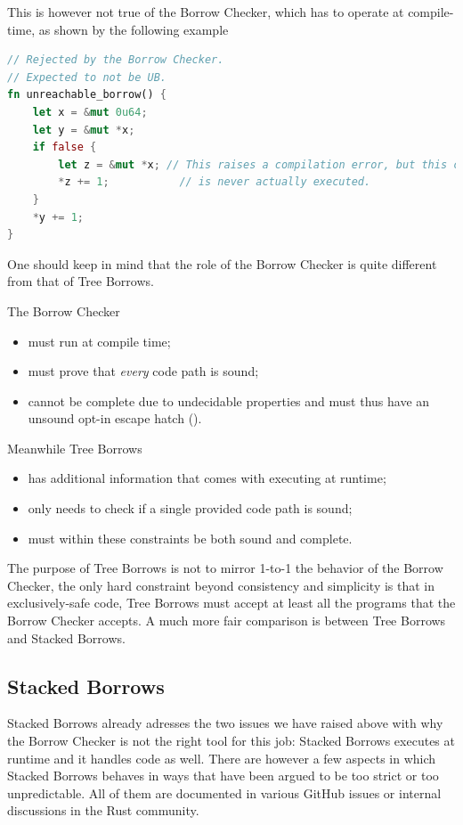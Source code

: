 \documentclass[a4paper,11pt]{article}
\theoremstyle{plain}
\theoremstyle{definition}
\theoremstyle{remark}
\newcommand{\tcode}[1]{\rstinline{#1}}
\begin{document}
This is however not true of the Borrow Checker, which has to operate at compile-time,
as shown by the following example
\begin{lstlisting}[language=rust]
// Rejected by the Borrow Checker.
// Expected to not be UB.
fn unreachable_borrow() {
    let x = &mut 0u64;
    let y = &mut *x;
    if false {
        let z = &mut *x; // This raises a compilation error, but this code
        *z += 1;           // is never actually executed.
    }
    *y += 1;
}
\end{lstlisting}

One should keep in mind that the role of the Borrow Checker is quite different
from that of Tree Borrows.

The Borrow Checker
\begin{itemize}
    \item must run at compile time;
    \item must prove that \textit{every} code path is sound;
    \item cannot be complete due to undecidable properties and must thus
        have an unsound opt-in escape hatch (\tcode{unsafe}).
\end{itemize}
Meanwhile Tree Borrows
\begin{itemize}
    \item has additional information that comes with executing at runtime;
    \item only needs to check if a single provided code path is sound;
    \item must within these constraints be both sound and complete.
\end{itemize}

The purpose of Tree Borrows is not to mirror 1-to-1 the behavior of the Borrow
Checker, the only hard constraint beyond consistency and simplicity is that
in exclusively-safe code, Tree Borrows must accept at least all the programs
that the Borrow Checker accepts.
A much more fair comparison is between Tree Borrows and Stacked Borrows.

\subsection{Stacked Borrows}

Stacked Borrows already adresses the two issues we have raised above with
why the Borrow Checker is not the right tool for this job: Stacked Borrows
executes at runtime and it handles
\tcode{unsafe} code as well. There are however a few aspects in which
Stacked Borrows behaves in ways that have been argued to be too strict or
too unpredictable. All of them are documented in various GitHub issues
or internal discussions in the Rust community.
\end{document}
